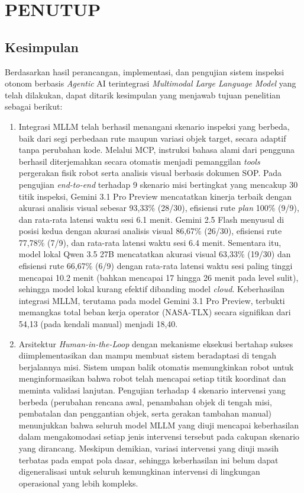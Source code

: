\chapter{PENUTUP}
\label{sec:chap5_tutup}
\vspace{1ex}

\section{Kesimpulan}
Berdasarkan hasil perancangan, implementasi, dan pengujian sistem inspeksi otonom berbasis \textit{Agentic} AI terintegrasi \textit{Multimodal Large Language Model} yang telah dilakukan, dapat ditarik kesimpulan yang menjawab tujuan penelitian sebagai berikut:

\begin{enumerate}
    \item Integrasi MLLM telah berhasil menangani skenario inspeksi yang berbeda, baik dari segi perbedaan rute maupun variasi objek target, secara adaptif tanpa perubahan kode. Melalui MCP, instruksi bahasa alami dari pengguna berhasil diterjemahkan secara otomatis menjadi pemanggilan \textit{tools} pergerakan fisik robot serta analisis visual berbasis dokumen SOP. Pada pengujian \textit{end-to-end} terhadap 9 skenario misi bertingkat yang mencakup 30 titik inspeksi, Gemini 3.1 Pro Preview mencatatkan kinerja terbaik dengan akurasi analisis visual sebesar 93,33\% (28/30), efisiensi rute \textit{plan} 100\% (9/9), dan rata-rata latensi waktu sesi 6.1 menit. Gemini 2.5 Flash menyusul di posisi kedua dengan akurasi analisis visual 86,67\% (26/30), efisiensi rute 77,78\% (7/9), dan rata-rata latensi waktu sesi 6.4 menit. Sementara itu, model lokal Qwen 3.5 27B mencatatkan akurasi visual 63,33\% (19/30) dan efisiensi rute 66,67\% (6/9) dengan rata-rata latensi waktu sesi paling tinggi mencapai 10.2 menit (bahkan mencapai 17 hingga 26 menit pada level sulit), sehingga model lokal kurang efektif dibanding model \textit{cloud}. Keberhasilan integrasi MLLM, terutama pada model Gemini 3.1 Pro Preview, terbukti memangkas total beban kerja operator (NASA-TLX) secara signifikan dari 54,13 (pada kendali manual) menjadi 18,40.
    
    \item Arsitektur \textit{Human-in-the-Loop} dengan mekanisme eksekusi bertahap sukses diimplementasikan dan mampu membuat sistem beradaptasi di tengah berjalannya misi. Sistem umpan balik otomatis memungkinkan robot untuk menginformasikan bahwa robot telah mencapai setiap titik koordinat dan meminta validasi lanjutan. Pengujian terhadap 4 skenario intervensi yang berbeda (perubahan rencana awal, penambahan objek di tengah misi, pembatalan dan penggantian objek, serta gerakan tambahan manual) menunjukkan bahwa seluruh model MLLM yang diuji mencapai keberhasilan dalam mengakomodasi setiap jenis intervensi tersebut pada cakupan skenario yang dirancang. Meskipun demikian, variasi intervensi yang diuji masih terbatas pada empat pola dasar, sehingga keberhasilan ini belum dapat digeneralisasi untuk seluruh kemungkinan intervensi di lingkungan operasional yang lebih kompleks.
\end{enumerate}

